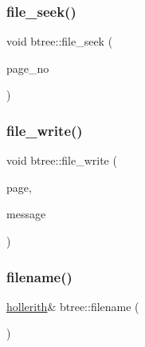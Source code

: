 \mbox{\label{classbtree_a829c985973c7c164fda2d81398e13504}} 
\subsubsection{\texorpdfstring{file\+\_\+seek()}{file\_seek()}}
{\footnotesize\ttfamily void btree\+::file\+\_\+seek (\begin{DoxyParamCaption}\item[{\mbox{\hyperlink{galois_8h_a09fddde158a3a20bd2dcadb609de11dc}{I\+NT}}}]{page\+\_\+no }\end{DoxyParamCaption})}

\mbox{\label{classbtree_ae5d8a2538af6625ee95573329c8e991b}} 
\subsubsection{\texorpdfstring{file\+\_\+write()}{file\_write()}}
{\footnotesize\ttfamily void btree\+::file\+\_\+write (\begin{DoxyParamCaption}\item[{\mbox{\hyperlink{discreta_8h_a433b49570cf2edc4c827e6442bd33998}{Page\+Typ}} $\ast$}]{page,  }\item[{const \mbox{\hyperlink{galois_8h_ab6cc7b4aeb6ea31aba2b3fbfc83ff5e6}{B\+Y\+TE}} $\ast$}]{message }\end{DoxyParamCaption})}

\mbox{\label{classbtree_ac15638387eb5a165403b8f73d584fe5a}} 
\subsubsection{\texorpdfstring{filename()}{filename()}}
{\footnotesize\ttfamily \mbox{\hyperlink{classhollerith}{hollerith}}\& btree\+::filename (\begin{DoxyParamCaption}{ }\end{DoxyParamCaption})\hspace{0.3cm}{\ttfamily [inline]}}

\mbox{\label{classbtree_a45bbef6d83e3e0ca26448baa2b4ea1c9}} 
